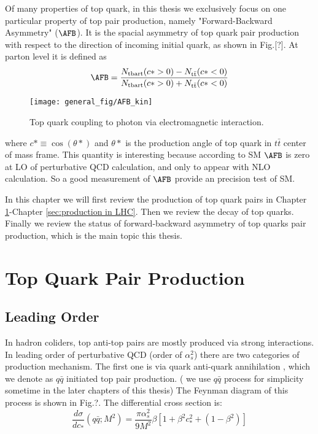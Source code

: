 Of many properties of top quark, in this thesis we exclusively focus on one particular property of top pair production, namely "Forward-Backward Asymmetry" ($\AFB$). It is the spacial asymmetry of top quark pair production with respect to the direction of incoming initial quark, as shown in Fig.[?]. At parton level it is defined as 
\begin{equation}
\AFB = \frac{N_{\mathrm{t bar t}}(c*>0)-N_{\mathrm{t\bar t}}(c*<0)}{N_{\mathrm{t bar t}}(c*>0)+N_{\mathrm{t\bar t}}(c*<0)}
\end{equation}

\begin{figure}[hbt]
  \begin{center}
    \texttt{[image: general\_fig/AFB\_kin]}
  \caption{\small Top quark coupling to photon via electromagnetic interaction.}
    \label{fig:ttgamma}
  \end{center}
\end{figure}

where $c*\equiv \cos(\theta*)$ and $\theta*$ is the production angle of top quark in $t\bar t$ center of mass frame. This quantity is interesting because according to SM $\AFB$ is zero at LO of perturbative QCD calculation, and only to appear with NLO calculation. So a good measurement of $\AFB$ provide an precision test of SM. 

In this chapter we will first review the production of top quark pairs in Chapter \ref{sec:Production}-Chapter \ref{sec:production in LHC}. Then we review the decay of top quarks. Finally we review the status of forward-backward asymmetry of top quarks pair production, which is the main topic this thesis. 

\section{Top Quark Pair Production}
\label{sec:Production}

\subsection{Leading Order}

In hadron coliders, top anti-top pairs are mostly produced via strong interactions. In leading order of perturbative QCD (order of $\alpha_s^2$) there are two categories of production mechanism. The first one is via quark anti-quark annihilation , which we denote as $q\bar{q}$ initiated top pair production. ( we use $q\bar q$ process for simplicity sometime in the later chapters of this thesis) The Feynman diagram of this process is shown in Fig.?. The differential cross section is:
\begin{equation}
\frac{d\sigma}{dc_*}(q\bar q;M^2) = \frac{\pi\alpha_s^2}{9M^2}\beta\left[1+\beta^2c_*^2+\left(1-\beta^2\right)\right]
\label{eq:qq_xsec_LO}
\end{equation}

